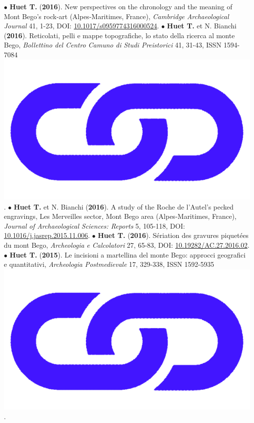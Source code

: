 \documentclass{article}
\begin{document}
\smallbreak
$\bullet$ \textbf{Huet T.} (\textbf{2016}). New perspectives on the chronology and the meaning of Mont Bego's rock-art (Alpes-Maritimes, France), \textit{Cambridge Archaeological Journal} 41, 1-23, DOI: \href{https://doi.org/10.1017/s0959774316000524}{10.1017/s0959774316000524}.
\smallbreak
$\bullet$ \textbf{Huet T.} et N. Bianchi (\textbf{2016}). Reticolati, pelli e mappe topografiche, lo stato della ricerca al monte Bego, \textit{Bollettino del Centro Camuno di Studi Preistorici} 41, 31-43, ISSN 1594-7084 \href{http://www.ccsp.it/web/infoccsp/bcsp/bcsp41_preview.pdf}{\includegraphics[scale=0.02]{link_darkblue.png}}.
\smallbreak
$\bullet$ \textbf{Huet T.} et N. Bianchi (\textbf{2016}). A study of the Roche de l'Autel's pecked engravings, Les Merveilles sector, Mont Bego area (Alpes-Maritimes, France), \textit{Journal of Archaeological Sciences: Reports} 5, 105-118, DOI: \href{https://doi.org/10.1016/j.jasrep.2015.11.006}{10.1016/j.jasrep.2015.11.006}.
\smallbreak
$\bullet$ \textbf{Huet T.} (\textbf{2016}). S\'{e}riation des gravures piquet\'{e}es du mont Bego, \textit{Archeologia e Calcolatori} 27, 65-83, DOI: \href{https://doi.org/10.19282/AC.27.2016.02}{10.19282/AC.27.2016.02}.
\smallbreak
$\bullet$ \textbf{Huet T.} (\textbf{2015}). Le incisioni a martellina del monte Bego: approcci geografici e quantitativi, \textit{Archeologia Postmedievale} 17, 329-338, ISSN 1592-5935 \href{https://www.insegnadelgiglio.it/wp-content/uploads/2015/01/APM_17_libro-anteprima.pdf}{\includegraphics[scale=0.02]{link_darkblue.png}}.
\end{document}
